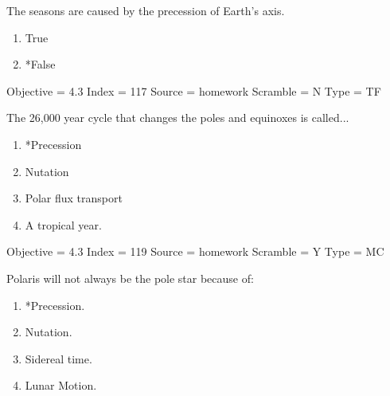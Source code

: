 \documentclass[11pt]{article}
\begin{document}
\begin{enumerate}
\begin{minipage}{\textwidth}
\begin{minipage}{\textwidth}
\item The seasons are caused by the precession of Earth's axis.
\begin{multicols}{3}
\begin{enumerate} 
\setlength{\itemsep}{1pt} 
\setlength{\parskip}{0pt} 
\setlength{\parsep}{0pt}
\setlength{\multicolsep}{1pt} 
\item True
\item *False
\end{enumerate} 
\vfill 
\end{multicols}

Objective = 4.3
Index = 117
Source = homework
Scramble = N
Type = TF
\end{minipage}
\end{minipage}
\vskip 0.20in

\begin{minipage}{\textwidth}
\begin{minipage}{\textwidth}
\item The 26,000 year cycle that changes the poles and equinoxes is called...
\begin{multicols}{2}
\begin{enumerate} 
\setlength{\itemsep}{1pt} 
\setlength{\parskip}{0pt} 
\setlength{\parsep}{0pt}
\setlength{\multicolsep}{1pt} 
\item *Precession
\item Nutation
\item Polar flux transport
\item A tropical year.
\end{enumerate} 
\vfill 
\end{multicols}

Objective = 4.3
Index = 119
Source = homework
Scramble = Y
Type = MC
\end{minipage}
\end{minipage}
\vskip 0.20in

\begin{minipage}{\textwidth}
\begin{minipage}{\textwidth}
\item Polaris will not always be the pole star because of:
\begin{multicols}{3}
\begin{enumerate} 
\setlength{\itemsep}{1pt} 
\setlength{\parskip}{0pt} 
\setlength{\parsep}{0pt}
\setlength{\multicolsep}{1pt} 
\item *Precession.
\item Nutation.
\item Sidereal time.
\item Lunar Motion.
\end{enumerate} 
\vfill 
\end{multicols}


\end{minipage}
\end{minipage}
\end{enumerate}
\end{document}
